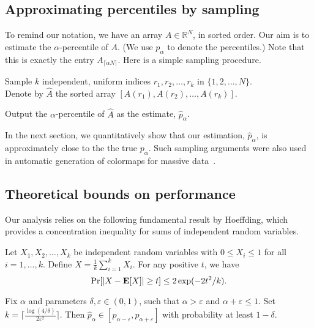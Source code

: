 \documentclass[final]{siamltex}
\newcommand{\RR}{\mathbb{R}}
\newcommand{\cei}[1]{\lceil #1 \rceil}
\newcommand{\eps}{\varepsilon}
\newcommand{\EX}{\hbox{\bf E}}
\newcommand{\pt}{{p}}
\newcommand{\samp}{k}
\begin{document}
\subsection{Approximating percentiles by sampling} \label{sec:samp}
To remind our notation,  we have an array $A \in \RR^N$, in sorted order.
Our aim is to estimate the $\alpha$-percentile of $A$. (We use $\pt_\alpha$ to denote
the percentiles.) Note that this 
is exactly the entry $A_{\lceil \alpha N \rceil}$. Here is a simple sampling procedure. \\
\begin{compactenum}
	\item Sample $\samp$ independent, uniform indices $r_1, r_2, \ldots, r_\samp$
	in $\{1,2,\ldots,N\}$. \\ Denote by $\widehat{A}$ the sorted array $[A(r_1),A(r_2),\ldots,A(r_\samp)]$.
	\item Output the $\alpha$-percentile of $\widehat{A}$ as the estimate, $\widehat{\pt}_\alpha$. \\
\end{compactenum}

In the next section, we quantitatively show that our estimation, $\widehat{\pt}_\alpha$, is approximately close to the the true $\pt_\alpha$.
Such sampling arguments were also used in automatic generation of colormaps for massive data~\cite{TBSP13}.

\subsection{Theoretical bounds on performance}
Our analysis  relies on the  following fundamental result by Hoeffding, which provides a concentration inequality for sums of independent random variables.

\begin{theorem}
  \label{thm:Hoeffding}
  Let $X_1, X_2, \dots, X_k$ be independent random variables with $0
  \leq X_i \leq 1$ for all $i=1,\dots,k$.  Define $X =
  \frac{1}{k} \sum_{i=1}^k X_i$. 
  For any positive $t$, we have \[ \Pr[|X - \EX[X]| \geq t] \leq 2 \exp(-2 t^2/k).\]
\end{theorem}

\begin{lemma} \label{lem:perc} Fix $\alpha$ and parameters $\delta, \eps \in (0,1)$, such that $\alpha > \eps$ and $\alpha + \eps \leq 1$.
Set $\samp = \cei{\frac{\log(4/\delta)}{2\eps^2}}$. Then $\widehat{\pt}_\alpha \in [\pt_{\alpha - \eps},\pt_{\alpha+\eps}]$
with probability at least $1-\delta$.
\end{lemma}
\end{document}
